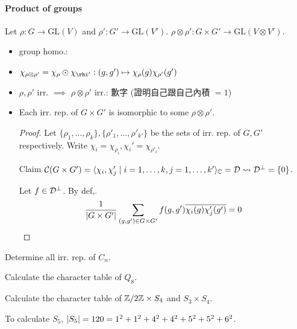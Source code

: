 \paragraph{Product of groups}
Let $\rho: G\to \text{GL}(V)$ and $\rho': G'\to \text{GL}(V')$.
$\rho\otimes\rho' : G \times G' \to \text{GL}(V\otimes V')$.

\begin{itemize}
  \item group homo.:
  \item $\chi_{\rho\otimes \rho'} = \chi_\rho \odot \chi_{\rhi'}:
    (g, g') \mapsto \chi_\rho(g) \chi_{\rho'}(g')$
  \item $\rho, \rho'$ irr. $\implies$ $\rho\otimes\rho'$ irr.:
    歉字 (證明自己跟自己內積 $=1$)

  \item Each irr. rep. of $G\times G'$ is isomorphic to some
    $\rho \otimes \rho'$.
    \begin{proof}
      Let $\{\rho_1,\dots,\rho_k\}, \{\rho'_1,\dots,\rho'_{k'}\}$ be the sets
      of irr. rep. of $G, G'$ respectively.
      Write $\chi_i = \chi_{\rho_i}, \chi_i' = \chi_{\rho'_i}$.
      
      Claim $\mathcal{C}(G\times G') = \langle\chi_i, \chi_j' \mid
      i = 1,\dots,k, j = 1,\dots,k'\rangle_{\mathbb{C}} = \mathcal{D} \leadsto \mathcal{D}^\perp = \{0\}$.

      Let $f \in \mathcal{D}^\perp$. By def,.
      \[
        \frac{1}{\lvert G\times G'\rvert} \sum_{(g,g')\in G\times G'}
        f(g,g')\overline{\chi_i(g)\chi_j'(g')} = 0
      \]
    \end{proof}
\end{itemize}

\begin{exercise}
  Determine all irr. rep. of $C_n$.
\end{exercise}

\begin{exercise}
  Calculate the character table of $Q_8$.
\end{exercise}

\begin{exercise}
  Calculate the character table of ${\mathbb{Z}}/{2\mathbb{Z}}\times S_4$ and
  $S_3\times S_4$.
\end{exercise}

To calculate $S_5$, $\lvert S_5\rvert = 120 = 1^2 + 1^2 + 4^2 + 4^2 + 5^2 + 5^2 + 6^2$.
